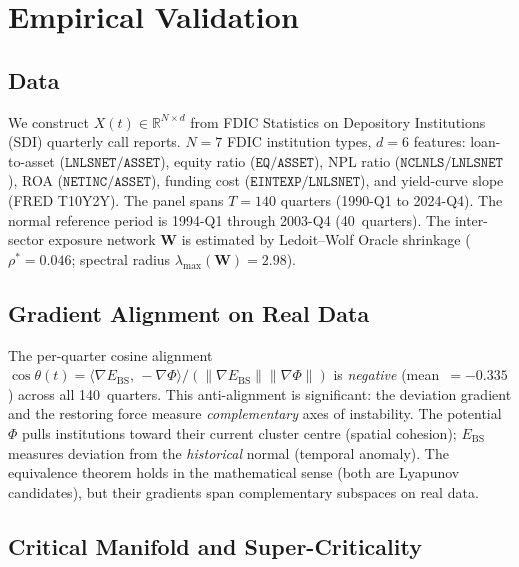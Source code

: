 \documentclass[final]{siamltex}
\newcommand{\R}{\mathbb{R}}
\newcommand{\norm}[1]{\lVert #1 \rVert}
\newcommand{\inner}[2]{\langle #1,\, #2 \rangle}
\providecommand{\grad}{\nabla}
\newcommand{\Ebs}{E_{\mathrm{BS}}}
\newcommand{\lmax}{\lambda_{\max}}
\newcommand{\costheta}{\cos\theta}
\begin{document}
\section{Empirical Validation}\label{sec:empirical}

\subsection{Data}\label{sec:data}

We construct $X(t)\in\R^{N\times d}$ from FDIC Statistics on
Depository Institutions (SDI) quarterly call reports. $N=7$ FDIC
institution types, $d=6$ features: loan-to-asset
($\texttt{LNLSNET}/\texttt{ASSET}$), equity ratio
($\texttt{EQ}/\texttt{ASSET}$), NPL ratio
($\texttt{NCLNLS}/\texttt{LNLSNET}$), ROA
($\texttt{NETINC}/\texttt{ASSET}$), funding cost
($\texttt{EINTEXP}/\texttt{LNLSNET}$), and yield-curve slope
(FRED T10Y2Y). The panel spans $T=140$ quarters (1990-Q1 to
2024-Q4). The normal reference period is 1994-Q1 through 2003-Q4
(40~quarters). The inter-sector exposure network $\mathbf{W}$ is
estimated by Ledoit--Wolf Oracle shrinkage \cite{ledoit2004}
($\rho^*=0.046$; spectral radius $\lmax(\mathbf{W})=2.98$).

\subsection{Gradient Alignment on Real Data}

The per-quarter cosine alignment $\costheta(t)=
\inner{\grad\Ebs}{-\grad\Phi}/
(\norm{\grad\Ebs}\norm{\grad\Phi})$ is \emph{negative}
(mean~$=-0.335$) across all 140~quarters. This anti-alignment is
significant: the deviation gradient and the restoring force measure
\emph{complementary} axes of instability. The potential $\Phi$ pulls
institutions toward their current cluster centre (spatial cohesion);
$\Ebs$ measures deviation from the \emph{historical} normal
(temporal anomaly). The equivalence theorem holds in the
mathematical sense (both are Lyapunov candidates), but their
gradients span complementary subspaces on real data.

\subsection{Critical Manifold and Super-Criticality}
\end{document}
